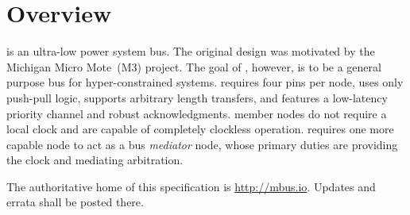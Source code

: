 \section*{Overview}
\bus is an ultra-low power system bus. The original design was motivated by
the Michigan Micro Mote~(M3) project. The goal of \bus, however, is to be a
general purpose bus for hyper-constrained systems. \bus requires four pins per
node, uses only push-pull logic, supports arbitrary length transfers, and
features a low-latency priority channel and robust acknowledgments. \bus
member nodes do not require a local clock and are capable of completely
clockless operation. \bus requires one more capable node to act as a bus {\em
mediator} node, whose primary duties are providing the \bus clock and
mediating arbitration.

\bigskip
\noindent
The authoritative home of this specification is \url{http://mbus.io}. Updates
and errata shall be posted there.
